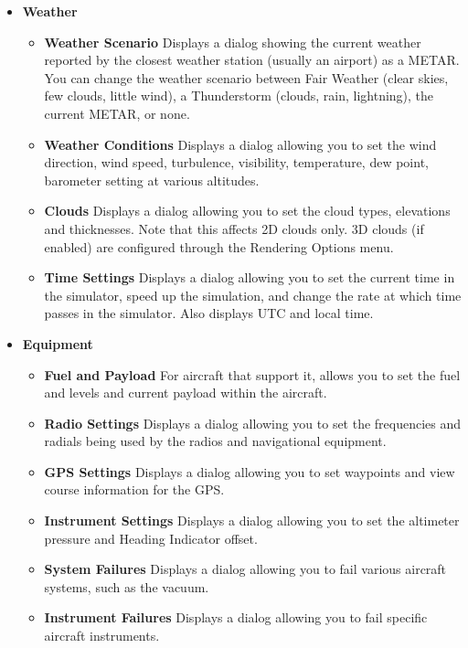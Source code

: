 \begin{itemize}
\item \textbf{Weather}
 \begin{itemize}
  \item \textbf{Weather Scenario} Displays a dialog showing the current weather
reported by the closest 
  weather station (usually an airport) as a METAR. You can change the weather
scenario between 
  Fair Weather (clear skies, few clouds, little wind), a Thunderstorm (clouds,
rain, lightning), the current METAR, or none.
  \item \textbf{Weather Conditions}  Displays a dialog allowing you to set the
wind direction, wind speed, 
  turbulence, visibility, temperature, dew point, barometer setting at various
altitudes. 
  \item \textbf{Clouds}  Displays a dialog allowing you to set the cloud types,
elevations and thicknesses. 
  Note that this affects 2D clouds only. 3D clouds (if enabled) are configured
through the Rendering Options menu.
  \item \textbf{Time Settings}  Displays a dialog allowing you to set the current
time in the simulator, speed up the simulation, and change the rate at which
time passes in the simulator. Also displays UTC and local time.
 \end{itemize}
 
\item \textbf{Equipment} 
 \begin{itemize}
  \item \textbf{Fuel and Payload}  For aircraft that support it, allows you to
set the fuel and levels 
  and current payload within the aircraft.
  \item \textbf{Radio Settings}  Displays a dialog allowing you to set the
frequencies and radials being 
  used by the radios and navigational equipment.
  \item \textbf{GPS Settings}  Displays a dialog allowing you to set waypoints
and view course information for the GPS.
  \item \textbf{Instrument Settings}  Displays a dialog allowing you to set the
altimeter pressure and Heading Indicator offset.   
  \item \textbf{System Failures} Displays a dialog allowing you to fail various
aircraft systems, such as the vacuum.
  \item \textbf{Instrument Failures}  Displays a dialog allowing you to fail
specific aircraft instruments.
 \end{itemize}


\end{itemize}
